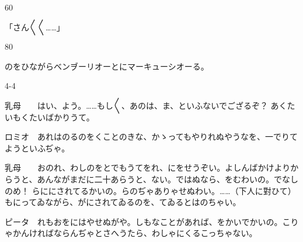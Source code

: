 \documentclass[tate,paper=b6j,jafontsize=9pt]{jlreq}
\begin{document}
\begin{azconvIndented}{6\zw}{0\zw}

「さん{〳〵}{〳〵}……」

\end{azconvIndented}
\begin{azconvIndented}{8\zw}{0\zw}

のをひながらベンヺーリオーとにマーキューシオーる。

\end{azconvIndented}
\begin{azconvIndented}{4\zw}{-4\zw}

乳母　　はい、よう。……もし{〳〵}、あのは、ま、といふないでござるぞ？ あくたいもくたいばかりうて。

ロミオ　あれはのるのをくことのきな、かゝってもやりれぬやうなを、一でりてようといふぢゃ。

乳母　　おのれ、わしのをとでもうてをれ、にをせうぞい。よしんばかけよりからうと、あんながまだに二十あらうと、ない。ではぬなら、をむわいの。でなしのめ！ らににされてるかいの。らのぢゃありゃせぬわい。……（下人に對ひて）もにってゐながら、がにされてゐるのを、てゐるとはのちゃい。

ピータ　れもおをにはやせぬがや。しもなことがあれば、をかいでかいの。こりゃかんければならんぢゃとさへうたら、わしゃにくるこっちゃない。


\end{azconvIndented}
\end{document}
